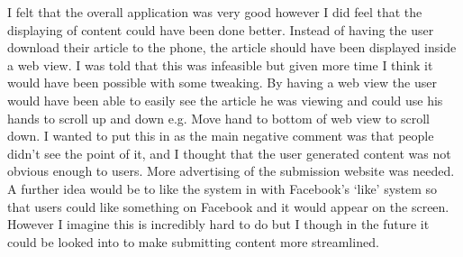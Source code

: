 I felt that the overall application was very good however I did feel that the displaying of content could have been done better. Instead of having the user download their article to the phone, the article should have been displayed inside a web view. I was told that this was infeasible but given more time I think it would have been possible with some tweaking. By having a web view the user would have been able to easily see the article he was viewing and could use his hands to scroll up and down e.g. Move hand to bottom of web view to scroll down. I wanted to put this in as the main negative comment was that people didn't see the point of it, and I thought that the user generated content was not obvious enough to users. More advertising of the submission website was needed. A further idea would be to like the system in with Facebook's `like' system so that users could like something on Facebook and it would appear on the screen. However I imagine this is incredibly hard to do but I though in the future it could be looked into to make submitting content more streamlined.
